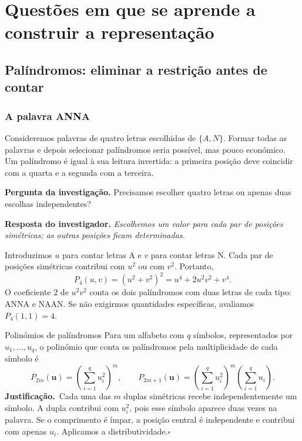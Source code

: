 \documentclass[11pt,a4paper,oneside]{book}
\newcommand{\Pergunta}[1]{\begin{perguntabox}\textbf{Pergunta da investigação.} #1\end{perguntabox}}
\newcommand{\Resposta}[1]{\textcolor{verdeescuro}{\textbf{Resposta do investigador.}} \emph{#1}\par}
\newcommand{\prova}{\textbf{Justificação.}\ }
\newcommand{\fimprova}{\hfill$\square$}
\newcommand{\rom}[1]{\textsc{#1}}
\begin{document}
\part{Questões em que se aprende a construir a representação}
\chapter{Palíndromos: eliminar a restrição antes de contar}
\section{A palavra ANNA}
Consideremos palavras de quatro letras escolhidas de $\{A,N\}$. Formar todas as palavras e depois selecionar palíndromos seria possível, mas pouco económico. Um palíndromo é igual à sua leitura invertida: a primeira posição deve coincidir com a quarta e a segunda com a terceira.
\begin{center}
\end{center}
\Pergunta{Precisamos escolher quatro letras ou apenas duas escolhas independentes?}
\Resposta{Escolhemos um valor para cada par de posições simétricas; as outras posições ficam determinadas.}
Introduzimos $u$ para contar letras A e $v$ para contar letras N. Cada par de posições simétricas contribui com $u^2$ ou com $v^2$. Portanto,
\[P_4(u,v)=(u^2+v^2)^2=u^4+2u^2v^2+v^4.\]
O coeficiente $2$ de $u^2v^2$ conta os dois palíndromos com duas letras de cada tipo: \rom{ANNA} e \rom{NAAN}. Se não exigirmos quantidades específicas, avaliamos $P_4(1,1)=4$.
\begin{teoremabox}{Polinómios de palíndromos}
Para um alfabeto com $q$ símbolos, representados por $u_1,\ldots,u_q$, o polinómio que conta os palíndromos pela multiplicidade de cada símbolo é
\[
P_{2m}(\mathbf u)=\left(\sum_{i=1}^q u_i^2\right)^m,
\qquad
P_{2m+1}(\mathbf u)=\left(\sum_{i=1}^q u_i^2\right)^m\left(\sum_{i=1}^q u_i\right).
\]
\prova Cada uma das $m$ duplas simétricas recebe independentemente um símbolo. A dupla contribui com $u_i^2$, pois esse símbolo aparece duas vezes na palavra. Se o comprimento é ímpar, a posição central é independente e contribui com apenas $u_i$. Aplicamos a distributividade.\fimprova
\end{teoremabox}
\end{document}
